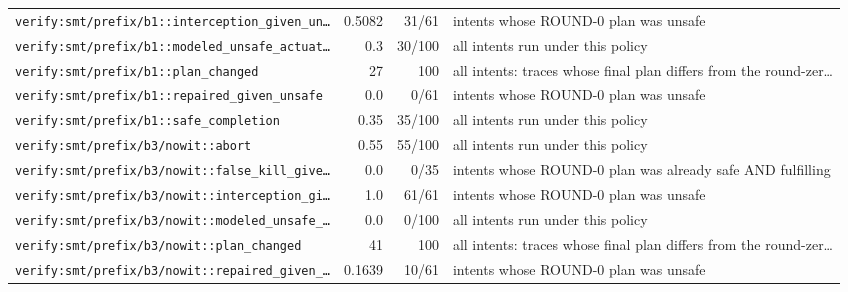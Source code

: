 \begin{center}
\begin{longtable}{@{}p{}rrp{}@{}}
\texttt{\scriptsize verify:\allowbreak smt/\allowbreak prefix/\allowbreak b1:\allowbreak :\allowbreak interception\_\allowbreak given\_\allowbreak un…} & 0.5082 & 31/61 & intents whose ROUND-0 plan was unsafe \\
\texttt{\scriptsize verify:\allowbreak smt/\allowbreak prefix/\allowbreak b1:\allowbreak :\allowbreak modeled\_\allowbreak unsafe\_\allowbreak actuat…} & 0.3 & 30/100 & all intents run under this policy \\
\texttt{\scriptsize verify:\allowbreak smt/\allowbreak prefix/\allowbreak b1:\allowbreak :\allowbreak plan\_\allowbreak changed} & 27 & 100 & all intents: traces whose final plan differs from the round-zer… \\
\texttt{\scriptsize verify:\allowbreak smt/\allowbreak prefix/\allowbreak b1:\allowbreak :\allowbreak repaired\_\allowbreak given\_\allowbreak unsafe} & 0.0 & 0/61 & intents whose ROUND-0 plan was unsafe \\
\texttt{\scriptsize verify:\allowbreak smt/\allowbreak prefix/\allowbreak b1:\allowbreak :\allowbreak safe\_\allowbreak completion} & 0.35 & 35/100 & all intents run under this policy \\
\texttt{\scriptsize verify:\allowbreak smt/\allowbreak prefix/\allowbreak b3/\allowbreak nowit:\allowbreak :\allowbreak abort} & 0.55 & 55/100 & all intents run under this policy \\
\texttt{\scriptsize verify:\allowbreak smt/\allowbreak prefix/\allowbreak b3/\allowbreak nowit:\allowbreak :\allowbreak false\_\allowbreak kill\_\allowbreak give…} & 0.0 & 0/35 & intents whose ROUND-0 plan was already safe AND fulfilling \\
\texttt{\scriptsize verify:\allowbreak smt/\allowbreak prefix/\allowbreak b3/\allowbreak nowit:\allowbreak :\allowbreak interception\_\allowbreak gi…} & 1.0 & 61/61 & intents whose ROUND-0 plan was unsafe \\
\texttt{\scriptsize verify:\allowbreak smt/\allowbreak prefix/\allowbreak b3/\allowbreak nowit:\allowbreak :\allowbreak modeled\_\allowbreak unsafe\_\allowbreak …} & 0.0 & 0/100 & all intents run under this policy \\
\texttt{\scriptsize verify:\allowbreak smt/\allowbreak prefix/\allowbreak b3/\allowbreak nowit:\allowbreak :\allowbreak plan\_\allowbreak changed} & 41 & 100 & all intents: traces whose final plan differs from the round-zer… \\
\texttt{\scriptsize verify:\allowbreak smt/\allowbreak prefix/\allowbreak b3/\allowbreak nowit:\allowbreak :\allowbreak repaired\_\allowbreak given\_\allowbreak …} & 0.1639 & 10/61 & intents whose ROUND-0 plan was unsafe \\

\end{longtable}
\end{center}
